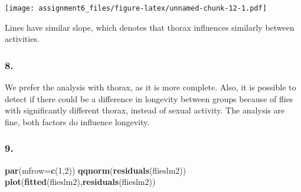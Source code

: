 \documentclass[11pt,]{article}
\newenvironment{Shaded}{\begin{snugshade}}{\end{snugshade}}
\newcommand{\KeywordTok}[1]{\textcolor[rgb]{0.13,0.29,0.53}{\textbf{{#1}}}}
\newcommand{\DataTypeTok}[1]{\textcolor[rgb]{0.13,0.29,0.53}{{#1}}}
\newcommand{\DecValTok}[1]{\textcolor[rgb]{0.00,0.00,0.81}{{#1}}}
\newcommand{\FloatTok}[1]{\textcolor[rgb]{0.00,0.00,0.81}{{#1}}}
\newcommand{\StringTok}[1]{\textcolor[rgb]{0.31,0.60,0.02}{{#1}}}
\newcommand{\NormalTok}[1]{{#1}}
\begin{document}
\begin{Shaded}
\end{Shaded}

\texttt{[image: assignment6\_files/figure-latex/unnamed-chunk-12-1.pdf]}

Lines have similar slope, which denotes that thorax influences similarly
between activities.

\subsubsection{8.}\label{section-6}

We prefer the analysis with thorax, as it is more complete. Also, it is
possible to detect if there could be a difference in longevity between
groups because of flies with significantly different thorax, instead of
sexual activity. The analysis are fine, both factors do influence
longevity.

\subsubsection{9.}\label{section-7}

\begin{Shaded}
\begin{Highlighting}[]
\KeywordTok{par}\NormalTok{(}\DataTypeTok{mfrow=}\KeywordTok{c}\NormalTok{(}\DecValTok{1}\NormalTok{,}\DecValTok{2}\NormalTok{))}
\KeywordTok{qqnorm}\NormalTok{(}\KeywordTok{residuals}\NormalTok{(flieslm2))}
\KeywordTok{plot}\NormalTok{(}\KeywordTok{fitted}\NormalTok{(flieslm2),}\KeywordTok{residuals}\NormalTok{(flieslm2))}
\end{Highlighting}
\end{Shaded}
\end{document}
